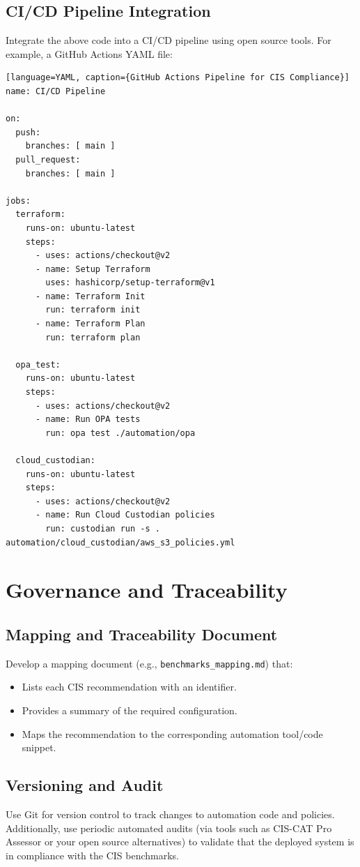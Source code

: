 \documentclass[12pt]{article}
\begin{document}
\subsection{CI/CD Pipeline Integration}
Integrate the above code into a CI/CD pipeline using open source tools. For example, a GitHub Actions YAML file:
\begin{verbatim}[language=YAML, caption={GitHub Actions Pipeline for CIS Compliance}]
name: CI/CD Pipeline

on:
  push:
    branches: [ main ]
  pull_request:
    branches: [ main ]

jobs:
  terraform:
    runs-on: ubuntu-latest
    steps:
      - uses: actions/checkout@v2
      - name: Setup Terraform
        uses: hashicorp/setup-terraform@v1
      - name: Terraform Init
        run: terraform init
      - name: Terraform Plan
        run: terraform plan

  opa_test:
    runs-on: ubuntu-latest
    steps:
      - uses: actions/checkout@v2
      - name: Run OPA tests
        run: opa test ./automation/opa

  cloud_custodian:
    runs-on: ubuntu-latest
    steps:
      - uses: actions/checkout@v2
      - name: Run Cloud Custodian policies
        run: custodian run -s . automation/cloud_custodian/aws_s3_policies.yml
\end{verbatim}

\section{Governance and Traceability}
\subsection{Mapping and Traceability Document}
Develop a mapping document (e.g., \texttt{benchmarks\_mapping.md}) that:
\begin{itemize}
    \item Lists each CIS recommendation with an identifier.
    \item Provides a summary of the required configuration.
    \item Maps the recommendation to the corresponding automation tool/code snippet.
\end{itemize}

\subsection{Versioning and Audit}
Use Git for version control to track changes to automation code and policies. Additionally, use periodic automated audits (via tools such as CIS-CAT Pro Assessor or your open source alternatives) to validate that the deployed system is in compliance with the CIS benchmarks.
\end{document}
